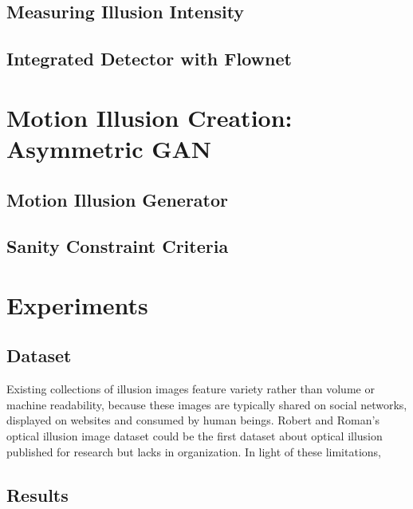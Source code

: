 \documentclass[journal]{IEEEtran}
\begin{document}
\subsection{Measuring Illusion Intensity}
\label{sec:detection_measure}

\subsection{Integrated Detector with Flownet}
\label{sec:detection_idf}

\section{Motion Illusion Creation: Asymmetric GAN}
\label{sec:generation}

\subsection{Motion Illusion Generator}
\label{sec:generation_generator}

\subsection{Sanity Constraint Criteria}
\label{sec:generation_criteria}

\section{Experiments}
\label{sec:experiments}

\subsection{Dataset}

Existing collections of illusion images feature variety rather than volume or machine readability, because these images are typically shared on social networks, displayed on websites and consumed by human beings. Robert and Roman's optical illusion image dataset \cite{williams2018optical} could be the first dataset about optical illusion published for research but lacks in organization. In light of these limitations,



\subsection{Results}
\end{document}
